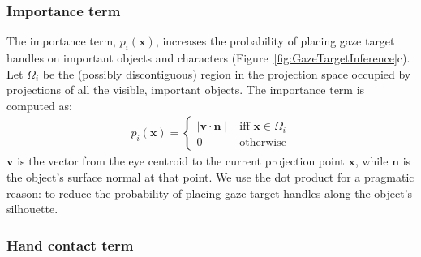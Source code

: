 \subsubsection{Importance term}

The importance term, $p_i(\mathbf{x})$, increases the probability of placing gaze target handles on important objects and characters (Figure~\ref{fig:GazeTargetInference}c). Let $\Omega_i$ be the (possibly discontiguous) region in the projection space occupied by projections of all the visible, important objects. The importance term is computed as:
%
\begin{align} \label{eq:GazeImportanceProbability}
p_i(\mathbf{x}) =
\begin{cases}
\mid \mathbf{v} \cdot \mathbf{n} \mid & \text{iff } \mathbf{x} \in \Omega_i  \\
0 & \text{otherwise}
\end{cases}
\end{align}
%
$\mathbf{v}$ is the vector from the eye centroid to the current projection point $\mathbf{x}$, while $\mathbf{n}$ is the object's surface normal at that point. We use the dot product for a pragmatic reason: to reduce the probability of placing gaze target handles along the object's silhouette.

\subsubsection{Hand contact term}

